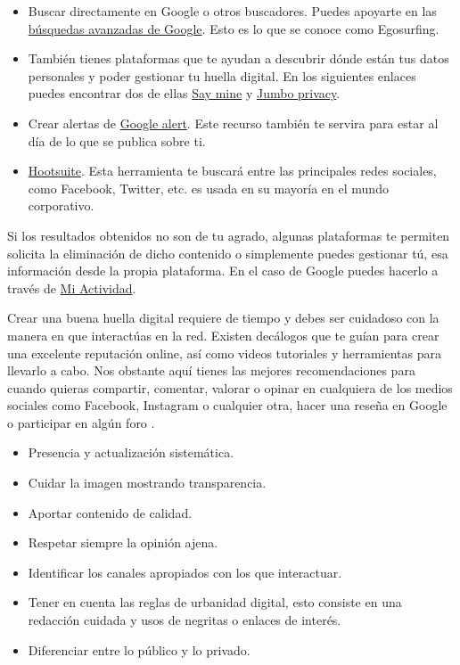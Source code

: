 \documentclass[
  a4paper,
  openany]{book}
\begin{document}
\begin{itemize}
\item
  Buscar directamente en Google o otros buscadores. Puedes apoyarte en las \href{https://support.google.com/websearch/answer/2466433?hl=es}{búsquedas avanzadas de Google}. Esto es lo que se conoce como Egosurfing.
\item
  También tienes plataformas que te ayudan a descubrir dónde están tus datos personales y poder gestionar tu huella digital. En los siguientes enlaces puedes encontrar dos de ellas \href{https://saymine.com/}{Say mine} y \href{https://www.jumboprivacy.com/}{Jumbo privacy}.
\item
  Crear alertas de \href{https://www.google.es/alerts}{Google alert}. Este recurso también te servira para estar al día de lo que se publica sobre ti.
\item
  \href{https://www.hootsuite.com/}{Hootsuite}. Esta herramienta te buscará entre las principales redes sociales, como Facebook, Twitter, etc. es usada en su mayoría en el mundo corporativo.
\end{itemize}

Si los resultados obtenidos no son de tu agrado, algunas plataformas te permiten solicita la eliminación de dicho contenido o simplemente puedes gestionar tú, esa información desde la propia plataforma. En el caso de Google puedes hacerlo a través de \href{https://myactivity.google.com/myactivity}{Mi Actividad}.

Crear una buena huella digital requiere de tiempo y debes ser cuidadoso con la manera en que interactúas en la red. Existen decálogos que te guían para crear una excelente reputación online, así como videos tutoriales y herramientas para llevarlo a cabo. Nos obstante aquí tienes las mejores recomendaciones para cuando quieras compartir, comentar, valorar o opinar en cualquiera de los medios sociales como Facebook, Instagram o cualquier otra, hacer una reseña en Google o participar en algún foro \citep{decalogo-digital}.

\begin{itemize}
\item
  Presencia y actualización sistemática.
\item
  Cuidar la imagen mostrando transparencia.
\item
  Aportar contenido de calidad.
\item
  Respetar siempre la opinión ajena.
\item
  Identificar los canales apropiados con los que interactuar.
\item
  Tener en cuenta las reglas de urbanidad digital, esto consiste en una redacción cuidada y usos de negritas o enlaces de interés.
\item
  Diferenciar entre lo público y lo privado.
\end{itemize}
\end{document}

